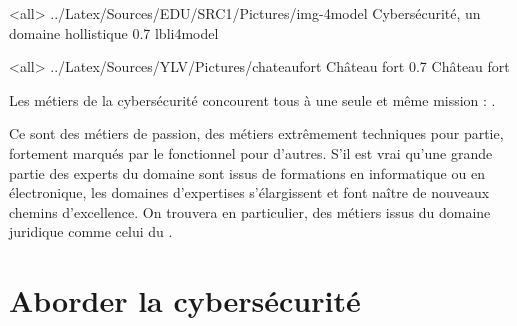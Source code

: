 \mode<all>{\picframe
{../Latex/Sources/EDU/SRC1/Pictures/img-4model}
{Cybersécurité, un domaine hollistique}
{0.7}
{lbli4model}
}

\mode<all>{\picframe
{../Latex/Sources/YLV/Pictures/chateaufort}%
{Château fort} %
{0.7} %
{Château fort} %
}



Les métiers de la cybersécurité concourent tous à une seule et même mission : .

Ce sont des métiers de passion, des métiers extrêmement techniques pour partie, fortement marqués par le fonctionnel pour d'autres. S'il est vrai qu'une grande partie des experts du domaine sont issus de formations en informatique ou en électronique, les domaines d'expertises s'élargissent et font naître de nouveaux chemins d'excellence. On trouvera en particulier, des métiers issus du domaine juridique comme celui du .    





\section{Aborder la cybersécurité}

